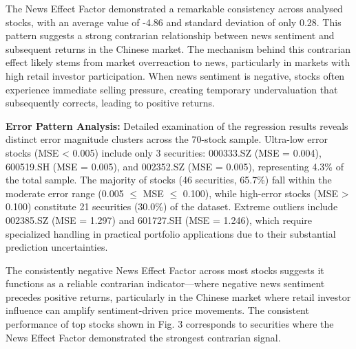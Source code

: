 \documentclass[3p,times,procedia]{elsarticle}
\begin{document}
\begin{table}[!ht]
\centering
\caption{\textbf{Factor Influence Analysis}}
\renewcommand{\arraystretch}{1.3} %
\end{table}

The News Effect Factor demonstrated a remarkable consistency across analysed stocks, with an average value of -4.86 and standard deviation of only 0.28. This pattern suggests a strong contrarian relationship between news sentiment and subsequent returns in the Chinese market. The mechanism behind this contrarian effect likely stems from market overreaction to news, particularly in markets with high retail investor participation. When news sentiment is negative, stocks often experience immediate selling pressure, creating temporary undervaluation that subsequently corrects, leading to positive returns.

\textbf{Error Pattern Analysis:} Detailed examination of the regression results reveals distinct error magnitude clusters across the 70-stock sample. Ultra-low error stocks (MSE < 0.005) include only 3 securities: 000333.SZ (MSE = 0.004), 600519.SH (MSE = 0.005), and 002352.SZ (MSE = 0.005), representing 4.3\% of the total sample. The majority of stocks (46 securities, 65.7\%) fall within the moderate error range (0.005 $\leq$ MSE $\leq$ 0.100), while high-error stocks (MSE > 0.100) constitute 21 securities (30.0\%) of the dataset. Extreme outliers include 002385.SZ (MSE = 1.297) and 601727.SH (MSE = 1.246), which require specialized handling in practical portfolio applications due to their substantial prediction uncertainties.

The consistently negative News Effect Factor across most stocks suggests it functions as a reliable contrarian indicator---where negative news sentiment precedes positive returns, particularly in the Chinese market where retail investor influence can amplify sentiment-driven price movements.
The consistent performance of top stocks shown in Fig. 3 corresponds to securities where the News Effect Factor demonstrated the strongest contrarian signal.
\end{document}
